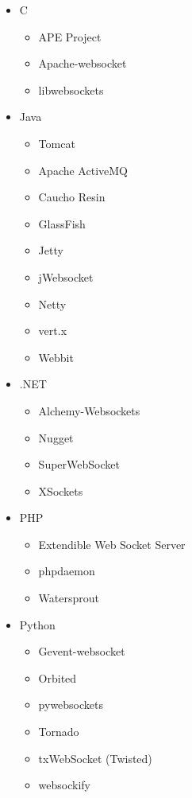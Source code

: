 \begin{itemize}
    \item{C
    \begin{itemize}
        \item{APE Project}
        \item{Apache-websocket}
        \item{libwebsockets}
    \end{itemize}
    }
    \item{Java
    \begin{itemize}
        \item{Tomcat}
        \item{Apache ActiveMQ}
        \item{Caucho Resin}
        \item{GlassFish}
        \item{Jetty}
        \item{jWebsocket}
        \item{Netty}
        \item{vert.x}
        \item{Webbit}
    \end{itemize}
    }
    \item{.NET
    \begin{itemize}
        \item{Alchemy-Websockets}
        \item{Nugget}
        \item{SuperWebSocket}
        \item{XSockets}
    \end{itemize}
    }
    \item{PHP
    \begin{itemize}
        \item{Extendible Web Socket Server}
        \item{phpdaemon}
        \item{Watersprout}
    \end{itemize}
    }
    \item{Python
    \begin{itemize}
        \item{Gevent-websocket}
        \item{Orbited}
        \item{pywebsockets}
        \item{Tornado}
        \item{txWebSocket (Twisted)}
        \item{websockify}
    \end{itemize}
}
\end{itemize}
